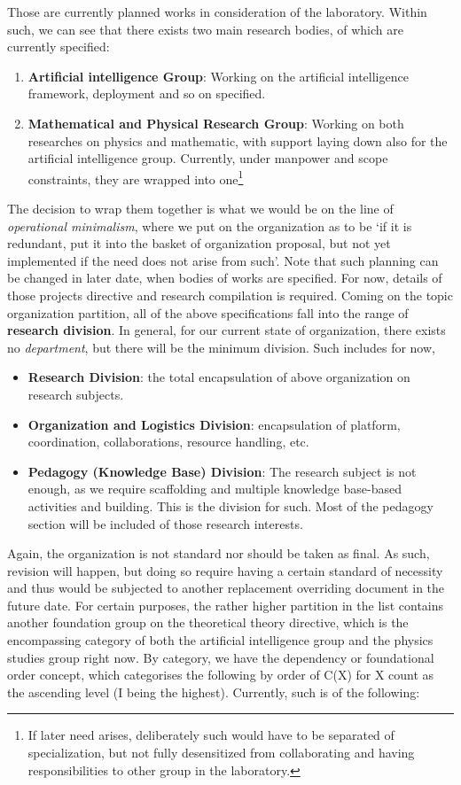 \documentclass[9pt,a4paper]{article}
\begin{document}
Those are currently planned works in consideration of the laboratory. Within such, we can see that there exists two main research bodies, of which are currently specified:
\begin{enumerate}[itemsep=1pt,topsep=0pt]
    \item \textbf{Artificial intelligence Group}: Working on the artificial intelligence framework, deployment and so on specified. 
    \item \textbf{Mathematical and Physical Research Group}: Working on both researches on physics and mathematic, with support laying down also for the artificial intelligence group. Currently, under manpower and scope constraints, they are wrapped into one\footnote{If later need arises, deliberately such would have to be separated of specialization, but not fully desensitized from collaborating and having responsibilities to other group in the laboratory.} 
\end{enumerate}
The decision to wrap them together is what we would be on the line of \textit{operational minimalism}, where we put on the organization as to be `if it is redundant, put it into the basket of organization proposal, but not yet implemented if the need does not arise from such'. Note that such planning can be changed in later date, when bodies of works are specified. For now, details of those projects directive and research compilation is required. Coming on the topic organization partition, all of the above specifications fall into the range of \textbf{research division}. In general, for our current state of organization, there exists no \textit{department}, but there will be the minimum division. Such includes for now,
\begin{itemize}[itemsep=1pt,topsep=1pt]
    \item \textbf{Research Division}: the total encapsulation of above organization on research subjects. 
    \item \textbf{Organization and Logistics Division}: encapsulation of platform, coordination, collaborations, resource handling, etc. 
    \item \textbf{Pedagogy (Knowledge Base) Division}: The research subject is not enough, as we require scaffolding and multiple knowledge base-based activities and building. This is the division for such. Most of the pedagogy section will be included of those research interests. 
\end{itemize}
Again, the organization is not standard nor should be taken as final. As such, revision will happen, but doing so require having a certain standard of necessity and thus would be subjected to another replacement overriding document in the future date. For certain purposes, the rather higher partition in the list contains another foundation group on the theoretical theory directive, which is the encompassing category of both the artificial intelligence group and the physics studies group right now. By category, we have the dependency or foundational order concept, which categorises the following by order of C(X) for X count as the ascending level (I being the highest). Currently, such is of the following:
\end{document}
